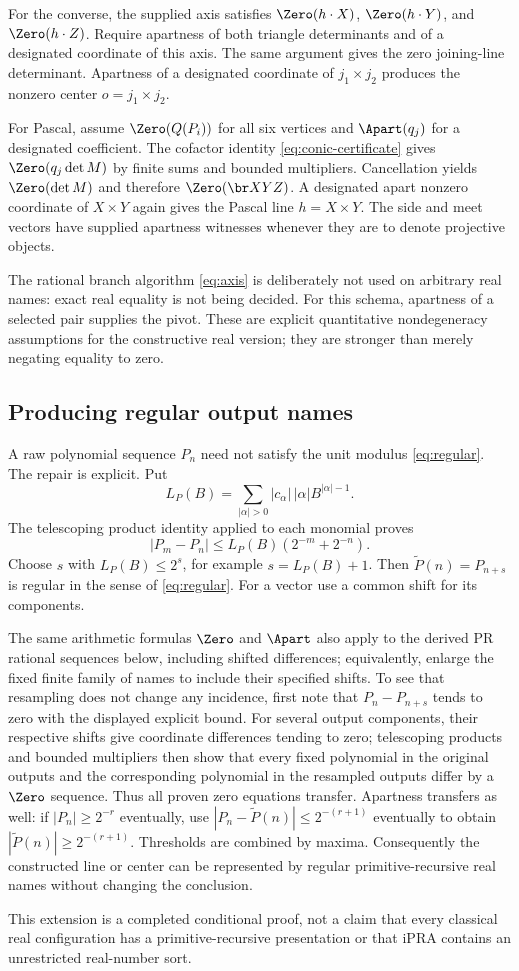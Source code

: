 For the converse, the supplied axis satisfies $\Zero(h\cdot X)$,
$\Zero(h\cdot Y)$, and $\Zero(h\cdot Z)$. Require apartness of both
triangle determinants and of a designated coordinate of this axis. The same argument
gives the zero joining-line determinant. Apartness of a designated
coordinate of $j_1\times j_2$ produces the nonzero center
$o=j_1\times j_2$.

For Pascal, assume $\Zero(Q(P_i))$ for all six vertices and
$\Apart(q_j)$ for a designated coefficient. The cofactor identity
\eqref{eq:conic-certificate} gives $\Zero(q_j\det M)$ by finite sums
and bounded multipliers. Cancellation yields $\Zero(\det M)$ and
therefore $\Zero(\br X Y Z)$. A designated apart nonzero coordinate
of $X\times Y$ again gives the Pascal line $h=X\times Y$.
The side and meet vectors have supplied apartness witnesses whenever
they are to denote projective objects.

The rational branch algorithm \eqref{eq:axis} is deliberately not used
on arbitrary real names: exact real equality is not being decided.
For this schema, apartness of a selected pair supplies the pivot.
These are explicit quantitative nondegeneracy assumptions for the
constructive real version; they are stronger than merely negating
equality to zero.

\subsection{Producing regular output names}
A raw polynomial sequence $P_n$ need not satisfy the unit modulus
\eqref{eq:regular}. The repair is explicit. Put
\[
 L_P(B)=\sum_{|\alpha|>0}|c_\alpha|\,|\alpha|B^{|\alpha|-1}.
\]
The telescoping product identity applied to each monomial proves
\[
 |P_m-P_n|\le L_P(B)(2^{-m}+2^{-n}).
\]
Choose $s$ with $L_P(B)\le2^s$, for example $s=L_P(B)+1$.
Then $\widetilde P(n)=P_{n+s}$ is regular in the sense of
\eqref{eq:regular}. For a vector use a common shift for its components.

The same arithmetic formulas $\Zero$ and $\Apart$ also apply to the
derived PR rational sequences below, including shifted differences;
equivalently, enlarge the fixed finite family of names to include their
specified shifts. To see that resampling does not change any incidence, first note
that $P_n-P_{n+s}$ tends to zero with the displayed explicit bound.
For several output components, their respective shifts give
coordinate differences tending to zero; telescoping products and
bounded multipliers then show that every fixed polynomial in the
original outputs and the corresponding polynomial in the resampled
outputs differ by a $\Zero$ sequence. Thus all proven zero equations
transfer. Apartness transfers as well: if $|P_n|\ge2^{-r}$ eventually,
use $|P_n-\widetilde P(n)|\le2^{-(r+1)}$ eventually to obtain
$|\widetilde P(n)|\ge2^{-(r+1)}$. Thresholds are combined by maxima.
Consequently the constructed line or center can be represented by
regular primitive-recursive real names without changing the conclusion.

This extension is a completed conditional proof, not a claim that every
classical real configuration has a primitive-recursive presentation or
that iPRA contains an unrestricted real-number sort.

